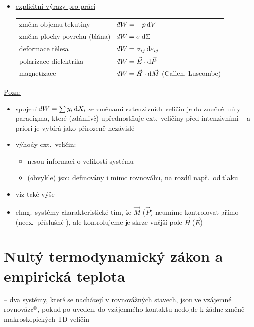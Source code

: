\begin{itemize}
  \item \underline{explicitní výrazy pro práci}

  \begin{tabular}{@{\quad$\bullet$ }ll}
    změna objemu tekutiny & $\dbar W = -p\,\dd V$ \\
    změna plochy povrchu (blána) & $\dbar W = \sigma\,\dd\Sigma$ \\
    deformace tělesa & $\dbar W = \sigma_{ij}\,\dd\varepsilon_{ij}$ \\
    polarizace dielektrika & $\dbar W = \vec E\cdot\dd\vec P$ \\
    magnetizace & $\dbar W = \vec H\cdot\dd\vec M$ \quad (Callen, Luscombe)
  \end{tabular}
\end{itemize}

\underline{Pozn:}
\begin{itemize}
  \item spojení $\dbar W = \sum y_i\,\dd X_i$ se změnami \underline{extenzivních} veličin je do značné míry paradigma, které (zdánlivě) upřednostňuje ext.\ veličiny před intenzivními -- a priori je vybírá jako přirozeně nezávislé
  \item výhody ext.\ veličin:
  \begin{itemize}[label=$\to$]
    \item nesou informaci o velikosti systému
    \item (obvykle) jsou definovány i mimo rovnováhu, na rozdíl např.\ od tlaku
  \end{itemize}
  \item viz také  výše
  \item elmg.\ systémy charakteristické tím, že $\vec M$ ($\vec P$) neumíme kontrolovat přímo (neex.\ příslušné ), ale kontrolujeme je skrze vnější pole $\vec H$ ($\vec E$)
\end{itemize}

\newpage
\section{Nultý termodynamický zákon a empirická teplota}

\begin{definice}
 -- dva systémy, které se nacházejí v rovnovážných stavech, jsou ve vzájemné rovnováze$^{\circledast}$, pokud po uvedení do vzájemného kontaktu nedojde k žádné změně makroskopických TD veličin

{\small{}}
\end{definice}


